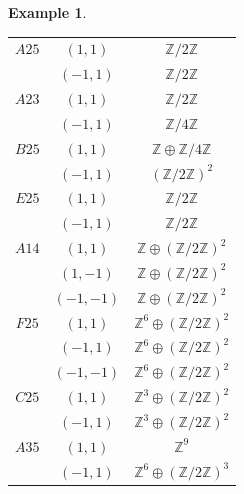 \documentclass[11pt]{amsart}
\newtheorem{example}[theorem]{Example}
\theoremstyle{definition}
\newcommand{\Z}{\mathbb{Z}}
\begin{document}
\begin{example}
\begin{center}
\begin{tabular}{c|c|c}
    $A25$ & $(1,1)$ & $\Z/2\Z$ \\
    & $(-1,1)$ & $\Z/2\Z$ \\
    $A23$ & $(1,1)$ & $\Z/2\Z$ \\
     & $(-1,1)$ & $\Z/4\Z$ \\
        $B25$ & $(1,1)$ & $\Z \oplus \Z/4\Z$ \\
        & $(-1,1)$ & $(\Z/2\Z)^2$ \\
        $E25$ & $(1,1)$ & $\Z/2\Z$ \\
         & $(-1,1)$ & $\Z/2\Z$ \\
        $A14$ & $(1,1)$ & $\Z \oplus (\Z/2\Z)^2$ \\
         & $(1,-1)$ & $\Z \oplus (\Z/2\Z)^2$ \\  
         & $(-1,-1)$ & $\Z \oplus (\Z/2\Z)^2$ \\
        $F25$ & $(1,1)$ & $\Z^6 \oplus (\Z/2\Z)^2$ \\
         & $(-1,1)$ & $\Z^6 \oplus (\Z/2\Z)^2$ \\     
         & $(-1,-1)$ & $\Z^6 \oplus (\Z/2\Z)^2$ \\  
        $C25$ & $(1,1)$ & $\Z^3 \oplus (\Z/2\Z)^2$ \\
         & $(-1,1)$ & $\Z^3 \oplus (\Z/2\Z)^2$ \\
        $A35$ & $(1,1)$ & $\Z^9$ \\
         & $(-1,1)$ & $\Z^6 \oplus (\Z/2\Z)^3$ \\ 
\end{tabular}

\end{center}

\end{example}
\end{document}
